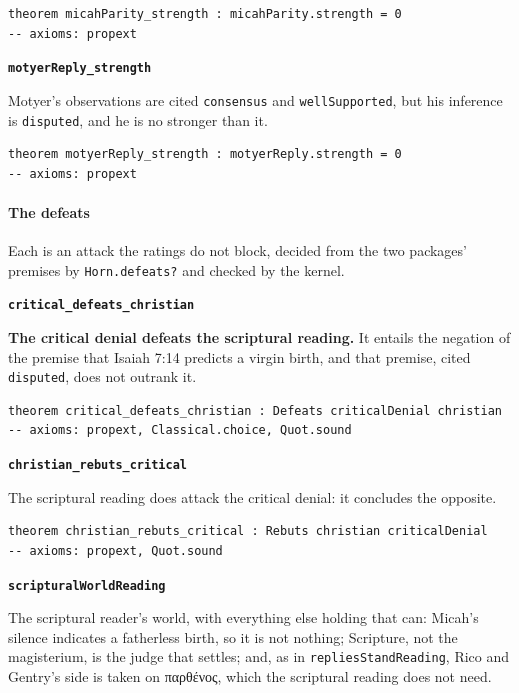 \documentclass[11pt]{article}
\begin{document}
{\small\begin{verbatim}
theorem micahParity_strength : micahParity.strength = 0
-- axioms: propext
\end{verbatim}}
\par\medskip\noindent\textbf{\texttt{motyer\allowbreak{}Reply\_\allowbreak{}strength}}\par\nobreak\noindent
Motyer’s observations are cited \texttt{consensus} and \texttt{well\allowbreak{}Supported}, but his inference is \texttt{disputed}, and he is no stronger than it.

{\small\begin{verbatim}
theorem motyerReply_strength : motyerReply.strength = 0
-- axioms: propext
\end{verbatim}}
\paragraph*{The defeats}
\leavevmode\par\nobreak
Each is an attack the ratings do not block, decided from the two packages’ premises by \texttt{Horn.defeats?} and checked by the kernel.

\par\medskip\noindent\textbf{\texttt{critical\_\allowbreak{}defeats\_\allowbreak{}christian}}\par\nobreak\noindent
\textbf{The critical denial defeats the scriptural reading.} It entails the negation of the premise that Isaiah 7:14 predicts a virgin birth, and that premise, cited \texttt{disputed}, does not outrank it.

{\small\begin{verbatim}
theorem critical_defeats_christian : Defeats criticalDenial christian
-- axioms: propext, Classical.choice, Quot.sound
\end{verbatim}}
\par\medskip\noindent\textbf{\texttt{christian\_\allowbreak{}rebuts\_\allowbreak{}critical}}\par\nobreak\noindent
The scriptural reading does attack the critical denial: it concludes the opposite.

{\small\begin{verbatim}
theorem christian_rebuts_critical : Rebuts christian criticalDenial
-- axioms: propext, Quot.sound
\end{verbatim}}
\par\medskip\noindent\textbf{\texttt{scriptural\allowbreak{}World\allowbreak{}Reading}}\par\nobreak\noindent
The scriptural reader’s world, with everything else holding that can: Micah’s silence indicates a fatherless birth, so it is not nothing; Scripture, not the magisterium, is the judge that settles; and, as in \texttt{replies\allowbreak{}Stand\allowbreak{}Reading}, Rico and Gentry’s side is taken on παρθένος, which the scriptural reading does not need.
\end{document}
